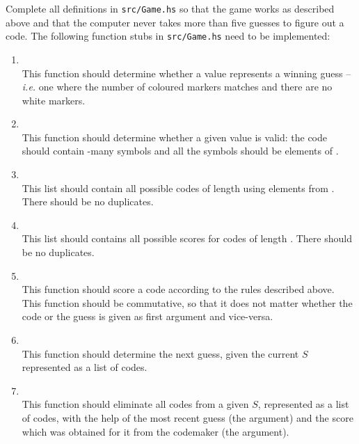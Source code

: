 Complete all definitions in \texttt{\small src/Game.hs} so that the game works as described above and that the computer never takes more than five guesses to figure out a code. The following function stubs in \texttt{\small src/Game.hs}  need to be implemented:

\begin{enumerate}
	\item {}\\
	This function should determine whether a  value represents a winning guess -- \emph{i.e.} one where the number of coloured markers matches  and there are no white markers.
	\item {}\\
	This function should determine whether a given  value is valid: the code should contain -many symbols and all the symbols should be elements of .
	\item {}\\
	This list should contain all possible codes of length  using elements from . There should be no duplicates.
	\item {}\\
	This list should contains all possible scores for codes of length . There should be no duplicates.
	\item {}\\
	This function should score a code according to the rules described above. This function should be commutative, so that it does not matter whether the code or the guess is given as first argument and vice-versa.
	\item {} \\
	This function should determine the next guess, given the current $S$ represented as a list of codes.
	\item {}\\
	This function should eliminate all codes from a given $S$, represented as a list of codes, with the help of the most recent guess (the  argument) and the score which was obtained for it from the codemaker (the  argument).
\end{enumerate}

